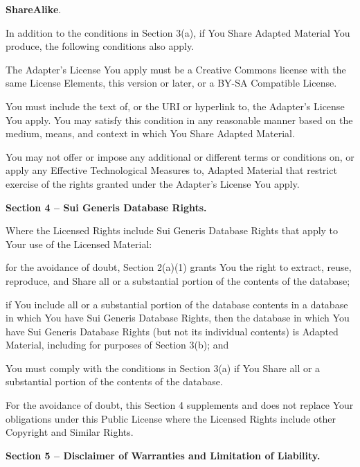 \begin{ccEnumerate}
		\item \textbf{ShareAlike}.
		      \par In addition to the conditions in Section 3(a), if You Share Adapted Material You produce, the following conditions also apply.
		      \begin{ccEnumerate}
		      	\item The Adapter’s License You apply must be a Creative Commons license with the same License Elements, this version or later, or a BY-SA Compatible License.
		      	\item You must include the text of, or the URI or hyperlink to, the Adapter's License You apply. You may satisfy this condition in any reasonable manner based on the medium, means, and context in which You Share Adapted Material.
		      	\item You may not offer or impose any additional or different terms or conditions on, or apply any Effective Technological Measures to, Adapted Material that restrict exercise of the rights granted under the Adapter's License You apply.
		      \end{ccEnumerate}
		      
	\end{ccEnumerate}
	\par \textbf{Section 4 – Sui Generis Database Rights.}
	\par Where the Licensed Rights include Sui Generis Database Rights that apply to Your use of the Licensed Material:
	\begin{ccEnumerate}
		\item for the avoidance of doubt, Section 2(a)(1) grants You the right to extract, reuse, reproduce, and Share all or a substantial portion of the contents of the database;
		\item if You include all or a substantial portion of the database contents in a database in which You have Sui Generis Database Rights, then the database in which You have Sui Generis Database Rights (but not its individual contents) is Adapted Material, including for purposes of Section 3(b); and
		\item You must comply with the conditions in Section 3(a) if You Share all or a substantial portion of the contents of the database.
	\end{ccEnumerate}
	For the avoidance of doubt, this Section 4 supplements and does not replace Your obligations under this Public License where the Licensed Rights include other Copyright and Similar Rights.
	\par \textbf{Section 5 – Disclaimer of Warranties and Limitation of Liability.}
